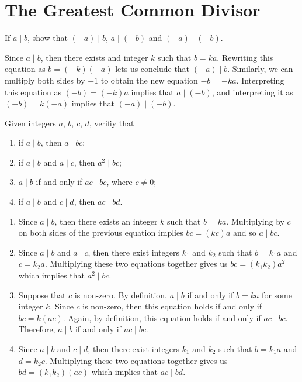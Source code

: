 \section{The Greatest Common Divisor}

\begin{exercise}
    If $a \mid b$, show that $(-a) \mid b$, $a \mid (-b)$ and $(-a) \mid (-b)$. \\
\end{exercise}

\begin{solution}
    Since $a \mid b$, then there exists and integer $k$ such that $b = ka$. Rewriting this equation as $b = (-k)(-a)$ lets us conclude that $(-a) \mid b$. Similarly, we can multiply both sides by $-1$ to obtain the new equation $-b = -ka$. Interpreting this equation as $(-b) = (-k)a$ implies that $a \mid (-b)$, and interpreting it as $(-b) = k(-a)$ implies that $(-a) \mid (-b)$. \\
\end{solution}

\begin{exercise}
    Given integers $a$, $b$, $c$, $d$, verifiy that
    \begin{enumerate}
        \item if $a \mid b$, then $a \mid bc$;
        \item if $a \mid b$ and $a \mid c$, then $a^2 \mid bc$;
        \item $a \mid b$ if and only if $ac \mid bc$, where $c \neq 0$;
        \item if $a \mid b$ and $c \mid d$, then $ac \mid bd$.
    \end{enumerate}
\end{exercise}

\begin{solution}
    \begin{enumerate}
        \item Since $a \mid b$, then there exists an integer $k$ such that $b = ka$. Multiplying by $c$ on both sides of the previous equation implies $bc = (kc)a$ and so $a \mid bc$.
        \item Since $a \mid b$ and $a \mid c$, then there exist integers $k_1$ and $k_2$ such that $b = k_1a$ and $c = k_2 a$. Multiplying these two equations together gives us $bc = (k_1 k_2)a^2$ which implies that $a^2 \mid bc$.
        \item Suppose that $c$ is non-zero. By definition, $a \mid b$ if and only if $b = ka$ for some integer $k$. Since $c$ is non-zero, then this equation holds if and only if $bc = k(ac)$. Again, by definition, this equation holds if and only if $ac \mid bc$. Therefore, $a \mid b$ if and only if $ac \mid bc$.
        \item Since $a \mid b$ and $c \mid d$, then there exist integers $k_1$ and $k_2$ such that $b = k_1a$ and $d = k_2 c$. Multiplying these two equations together gives us $bd = (k_1 k_2)(ac)$ which implies that $ac \mid bd$.
    \end{enumerate}
\end{solution}

